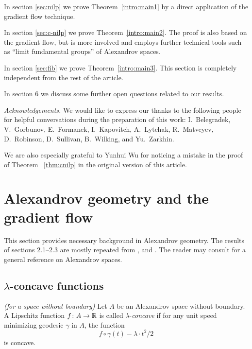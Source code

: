 \documentclass{amsart}
\begin{document}
In section \ref{sec:nilp} we prove Theorem~\ref{intro:main1} by a direct application of the gradient flow technique.

In section \ref{sec:c-nilp} we  prove Theorem~\ref{intro:main2}.
The proof is also based on the gradient flow, but
is more involved and employs further technical tools such as
``limit fundamental groups'' of Alexandrov spaces.

In section \ref{sec:fib} we prove Theorem~\ref{intro:main3}.
This section is completely independent from the rest of the article.

In section 6 we discuss some further open questions related to our results.

\smallskip

{\it Acknowledgements.}
We would like to express our thanks to the following people
for helpful conversations during the preparation of this work:
I.~Belegradek,
V.~Gorbunov, E.~Formanek, I.~Kapovitch, A.~Lytchak, R.~Matveyev, D.~Robinson,
D.~Sullivan,  B.~Wilking, and Yu.~Zarkhin.

We are also especially grateful to Yunhui Wu for noticing a mistake
in the  proof of Theorem ~\ref{thm:cnilp} in the original version of
this article.

\section{ Alexandrov geometry and the gradient flow}\label{s:gradpush}

This section
provides necessary background in Alexandrov geometry.
The results of sections 2.1--2.3 are mostly  repeated from  \cite{PP}, \cite{Ptr2} and \cite{Ptr2007}.
The reader may consult \cite{BGP} for a general reference on Alexandrov spaces.


\subsection{$\lambda$-concave functions}


\begin{defn}{\it (for a space without boundary)} Let $A$ be an Alexandrov space without boundary.
A Lipschitz function $f\colon A \rightarrow {\Bbb R}$ is called
$\lambda$-\emph{concave} if for any unit speed minimizing geodesic $\gamma$
in $A$, the function
$$f\circ\gamma(t)-\lambda\cdot  t^2/2$$
is concave.
\end{defn}
\end{document}

